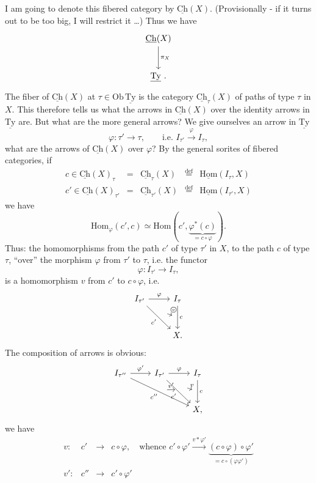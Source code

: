 \documentclass[11pt]{article}
\newcommand{\printedpage}[1]{\marginpar{\footnotesize p.~#1}}
\newcommand{\msp}[1]{\marginpar{\footnotesize [#1]}}
\newcommand{\Hom}{\mathrm{Hom}}
\newcommand{\uHom}{\underline{\mathrm{Hom}}}
\newcommand{\uCh}{\underline{\mathrm{Ch}}}
\newcommand{\uTy}{\underline{\mathrm{Ty}}}
\newcommand{\circled}[1]{\text{\textcircled{$\scriptstyle #1$}}}
\begin{document}
\msp{page 27}
I am going to denote this fibered category by $\uCh(X)$. (Provisionally - if it turns out to be too big, I will restrict it \dots) Thus we have
\[
\begin{tikzcd}[row sep=large]
\uCh(X) \arrow[d, "\pi_X"] \\
\uTy\ .
\end{tikzcd}
\]
The fiber of $\uCh(X)$ at $\tau\in\mathrm{Ob}\,\uTy$ is the category $\uCh_\tau(X)$ of paths of type $\tau$ in $X$. This therefore tells us what the arrows in $\uCh(X)$ over the identity arrows in $\uTy$ are. But what are the more general arrows? We give ourselves an arrow in $\uTy$
\[
\varphi : \tau' \longrightarrow \tau, \qquad \text{i.e. } I_{\tau'} \xrightarrow{\varphi} I_\tau,
\]
what are the arrows of $\uCh(X)$ over $\varphi$? By the general sorites of fibered categories, if
\[
\begin{array}{lclcl}
c\in\uCh(X)_\tau & = & \uCh_\tau(X) & \overset{\text{def}}{=} & \uHom(I_\tau,X)\\[1ex]
c'\in\uCh(X)_{\tau'} & = & \uCh_{\tau'}(X) & \overset{\text{def}}{=} & \uHom(I_{\tau'},X)
\end{array}
\]
we have
\[
\boxed{\Hom_\varphi(c',c)\simeq\Hom(c',\underbrace{\varphi^*(c)}_{=c\circ\varphi}).}
\]
Thus: the homomorphisms from the
\printedpage{18}
\msp{page 28}
path $c'$ of type $\tau'$ in $X$, to the path $c$ of type $\tau$, ``over'' the morphism $\varphi$ from $\tau'$ to $\tau$, i.e. the functor
\[
\varphi : I_{\tau'} \longrightarrow I_\tau,
\]
is a homomorphism $v$ from $c'$ to $c\circ\varphi$, i.e.
\[
\begin{tikzcd}[row sep=large]
I_{\tau'} \arrow[r, "\varphi"] \arrow[dr, "c'"', ""{name=A}] & I_\tau \arrow[d, "c", ""'{name=B}] \\
& X.
\arrow[from=A, to=B, bend left=20, shorten <=6pt, shorten >=2pt, "\circled{v}"]
\end{tikzcd}
\]
The composition of arrows is obvious:
\[
\begin{tikzcd}[row sep=large]
I_{\tau''} \arrow[r, "\varphi'"] \arrow[drr, "c''"', ""{name=C}] & I_{\tau'} \arrow[r, "\varphi"] \arrow[dr, "c'"', ""{name=A}] & I_\tau \arrow[d, "c", ""'{name=B}] \\
& & X,
\arrow[from=A, to=B, bend left=20, shorten <=6pt, shorten >=2pt, "v"]
\arrow[from=C, to=A, shorten <=4pt, shorten >=4pt, "v'"]
\end{tikzcd}
\]
we have
\[
\begin{array}{rccl}
v : & c' & \longrightarrow & c\circ\varphi, \quad \text{whence } c'\circ\varphi' \xrightarrow{v*\varphi'} \underbrace{(c\circ\varphi)\circ\varphi'}_{=c\circ(\varphi\varphi')}\\[3ex]
v' : & c'' & \longrightarrow & c'\circ\varphi'
\end{array}
\]
\end{document}
